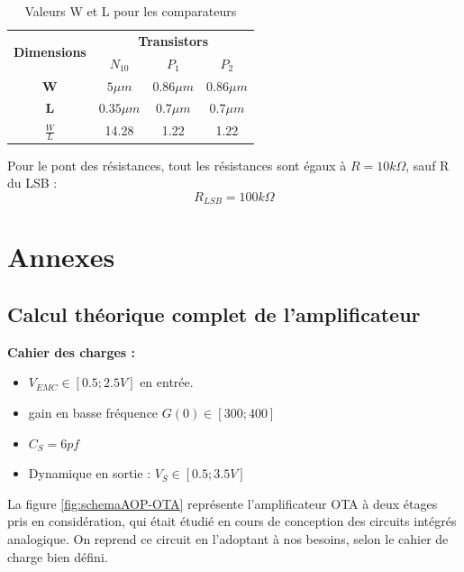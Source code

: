 \documentclass[11pt]{article}
\begin{document}
\begin{table}[!htb]
\centering
\label{tab:table4}
\begin{tabular}{|c|c|c|c|}
\hline
\multirow{2}{*}{\textbf{Dimensions}} & \multicolumn{3}{c|}{\textbf{Transistors}}           \\ \cline{2-4} 
                                     & \textbf{$N_{10}$} & \textbf{$P_1$} & \textbf{$P_2$} \\ \hline
\textbf{W}                           & $ 5 \mu m$        & $0.86 \mu m$   & $0.86 \mu m$   \\ \hline
\textbf{L}                           & $ 0.35 \mu m$     & $0.7 \mu m$    & $0.7 \mu m$    \\ \hline
\textbf{$\frac{W}{L}$}               & 14.28             & 1.22           & 1.22           \\ \hline
\end{tabular}
\caption{Valeurs W et L pour les comparateurs}
\end{table}

Pour le pont des r\'esistances, tout les r\'esistances sont \'egaux \`a $R = 10 k\Omega$, sauf R du LSB :
\[
R_{LSB} = 100 k \Omega
\]
\clearpage

\section{Annexes}
\subsection{Calcul th\'eorique complet de l'amplificateur}\label{Annexe1}

\textbf{Cahier des charges :} 
\begin{itemize}\itemsep -4pt
\item $V_{EMC} \in [0.5; 2.5V]$ en entr\'ee.
\item gain en basse fr\'equence $G(0) \in [300;400]$
\item $C_{S} = 6 pf$
\item Dynamique en sortie : $V_{S} \in [0.5; 3.5V]$ 
\end{itemize}

La figure \ref{fig:schemaAOP-OTA} repr\'esente l'amplificateur OTA \`a deux \'etages pris
en consid\'eration, qui \'etait \'etudi\'e en cours de conception des circuits int\'egr\'es analogique\cite{TD4-AOP}.
On reprend ce circuit en l'adoptant \`a nos besoins, selon le cahier de charge bien d\'efini.
\end{document}
